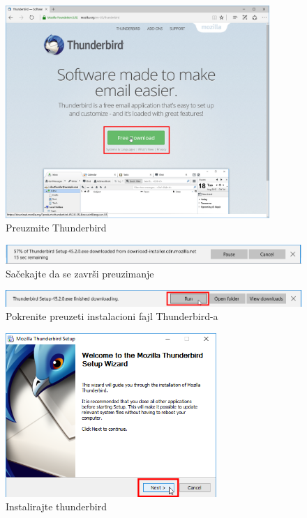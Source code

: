 \documentclass[a4paper,11pt]{article}
\begin{document}
\begin{figure}[!h]
	\begin{center}
		\includegraphics[width=10cm]{20_Thunderbird_Mozilla.png}
		\caption{Preuzmite Thunderbird}
		\label{initialscreen}
	\end{center}
\end{figure}
\begin{figure}[!h]
	\begin{center}
		\includegraphics[width=\textwidth]{21_Thunderbird_Mozilla_downloading.png}
		\caption{Sa\v{c}ekajte da se zavr\v{s}i preuzimanje}
		\label{initialscreen}
	\end{center}
\end{figure}
\begin{figure}[!h]
	\begin{center}
		\includegraphics[width=\textwidth]{22_Thunderbird_Mozilla_downloaded.png}
		\caption{Pokrenite preuzeti instalacioni fajl Thunderbird-a}
		\label{initialscreen}
	\end{center}
\end{figure}
\begin{figure}[!h]
	\begin{center}
		\includegraphics[width=8cm]{23_Mozilla_Thunderbird_Setup.png}
		\caption{Instalirajte thunderbird}
		\label{initialscreen}
	\end{center}
\end{figure}
\end{document}
